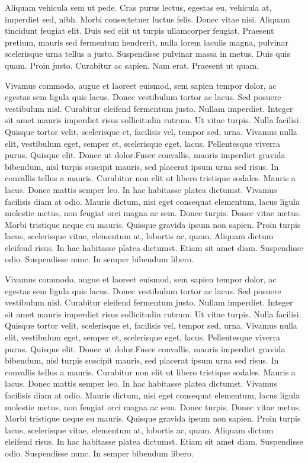 Aliquam vehicula sem ut pede. Cras purus lectus, egestas eu, vehicula at, imperdiet sed, nibh. Morbi consectetuer luctus felis. Donec vitae nisi. Aliquam tincidunt feugiat elit. Duis sed elit ut turpis ullamcorper feugiat. Praesent pretium, mauris sed fermentum hendrerit, nulla lorem iaculis magna, pulvinar scelerisque urna tellus a justo. Suspendisse pulvinar massa in metus. Duis quis quam. Proin justo. Curabitur ac sapien. Nam erat. Praesent ut quam.

Vivamus commodo, augue et laoreet euismod, sem sapien tempor dolor, ac egestas sem ligula quis lacus. Donec vestibulum tortor ac lacus. Sed posuere vestibulum nisl. Curabitur eleifend fermentum justo. Nullam imperdiet. Integer sit amet mauris imperdiet risus sollicitudin rutrum. Ut vitae turpis. Nulla facilisi. Quisque tortor velit, scelerisque et, facilisis vel, tempor sed, urna. Vivamus nulla elit, vestibulum eget, semper et, scelerisque eget, lacus. Pellentesque viverra purus. Quisque elit. Donec ut dolor.Fusce convallis, mauris imperdiet gravida bibendum, nisl turpis suscipit mauris, sed placerat ipsum urna sed risus. In convallis tellus a mauris. Curabitur non elit ut libero tristique sodales. Mauris a lacus. Donec mattis semper leo. In hac habitasse platea dictumst. Vivamus facilisis diam at odio. Mauris dictum, nisi eget consequat elementum, lacus ligula molestie metus, non feugiat orci magna ac sem. Donec turpis. Donec vitae metus. Morbi tristique neque eu mauris. Quisque gravida ipsum non sapien. Proin turpis lacus, scelerisque vitae, elementum at, lobortis ac, quam. Aliquam dictum eleifend risus. In hac habitasse platea dictumst. Etiam sit amet diam. Suspendisse odio. Suspendisse nunc. In semper bibendum libero.

Vivamus commodo, augue et laoreet euismod, sem sapien tempor dolor, ac egestas sem ligula quis lacus. Donec vestibulum tortor ac lacus. Sed posuere vestibulum nisl. Curabitur eleifend fermentum justo. Nullam imperdiet. Integer sit amet mauris imperdiet risus sollicitudin rutrum. Ut vitae turpis. Nulla facilisi. Quisque tortor velit, scelerisque et, facilisis vel, tempor sed, urna. Vivamus nulla elit, vestibulum eget, semper et, scelerisque eget, lacus. Pellentesque viverra purus. Quisque elit. Donec ut dolor.Fusce convallis, mauris imperdiet gravida bibendum, nisl turpis suscipit mauris, sed placerat ipsum urna sed risus. In convallis tellus a mauris. Curabitur non elit ut libero tristique sodales. Mauris a lacus. Donec mattis semper leo. In hac habitasse platea dictumst. Vivamus facilisis diam at odio. Mauris dictum, nisi eget consequat elementum, lacus ligula molestie metus, non feugiat orci magna ac sem. Donec turpis. Donec vitae metus. Morbi tristique neque eu mauris. Quisque gravida ipsum non sapien. Proin turpis lacus, scelerisque vitae, elementum at, lobortis ac, quam. Aliquam dictum eleifend risus. In hac habitasse platea dictumst. Etiam sit amet diam. Suspendisse odio. Suspendisse nunc. In semper bibendum libero.
